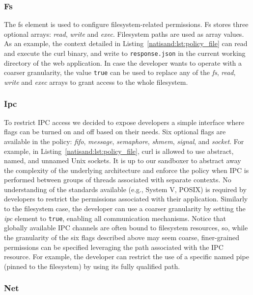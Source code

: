 \subsubsection*{Fs}

The fs element is used to configure filesystem-related permissions. Fs
stores three optional arrays: {\em read}, {\em write} and {\em
  exec}. Filesystem paths are used as array values. As an example, the
context detailed in Listing~\ref{natisand:lst:policy_file} can read and execute
the curl binary, and write to {\tt response.json} in the current
working directory of the web application. In case the developer wants
to operate with a coarser granularity, the value {\tt true} can be
used to replace any of the {\em fs}, {\em read}, {\em write} and {\em
  exec} arrays to grant access to the whole filesystem.

\subsubsection*{Ipc}

To restrict IPC access we decided to expose developers a simple
interface where flags can be turned on and off based on their needs.
Six optional flags are available in the policy: {\em fifo}, {\em
  message}, {\em semaphore}, {\em shmem}, {\em signal}, and {\em
  socket}. For example, in Listing~\ref{natisand:lst:policy_file}, curl is
allowed to use abstract, named, and unnamed Unix sockets. It is up to our sandboxer to abstract away the complexity
of the underlying architecture and enforce the policy when IPC is
performed between groups of threads associated with separate
contexts. No understanding of the standards available (e.g., System V,
POSIX) is required by developers to restrict the permissions
associated with their application. Similarly to the filesystem case, the
developer can use a coarser granularity by setting the {\em ipc}
element to {\tt true}, enabling all communication mechanisms.
Notice that globally available IPC channels are often bound to
filesystem resources, so, while the granularity of the six flags
described above may seem coarse, finer-grained permissions can be
specified leveraging the path associated with the IPC resource.
For example, the developer can restrict the use of a specific named
pipe (pinned to the filesystem) by using its fully qualified path.

\subsubsection*{Net}

